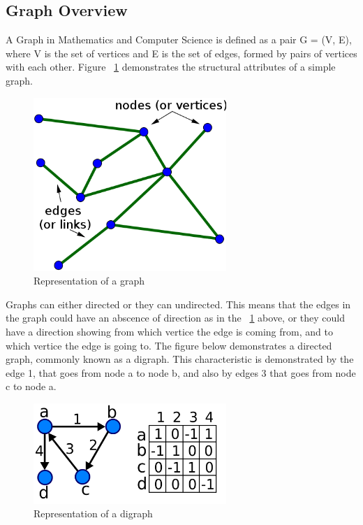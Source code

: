 \label{Graph Basics}

\subsection{Graph Overview}
A Graph in Mathematics and Computer Science is defined as a pair G = (V, E),  where V is the set of vertices and E is the set of edges, formed by pairs of vertices with each other. Figure ~\ref{fig:simplegraph} demonstrates the structural 
attributes of a simple graph.

\begin{figure}[H]
  \begin{center}
      \includegraphics[width=0.65\textwidth]{graph.png}
  \end{center}    
  \caption{Representation of a graph}
  \label{fig:simplegraph}
\end{figure} 

Graphs can either directed or they can undirected. This means that the edges in the graph could have an abscence of direction as in the ~\ref{fig:simplegraph} above, or they could have a direction showing from which
vertice the edge is coming from, and to which vertice the edge is going to. The figure below demonstrates a directed graph, commonly known as a digraph. This characteristic is demonstrated by the edge 1, 
that goes from node a to node b, and also by edges 3 that goes from node c to node a. 

\begin{figure}[H]
  \begin{center}
      \includegraphics[width=0.65\textwidth]{digraph.png}
  \end{center}    
  \caption{Representation of a digraph}
  \label{fig:directedgraph}
\end{figure} 

